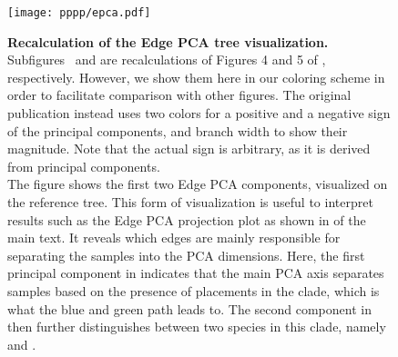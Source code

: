 \begin{figure}[hpbt]
    \centering
    \texttt{[image: pppp/epca.pdf]}
    \begin{subfigure}{0pt}
        \label{fig:epca:sub:comp1}
    \end{subfigure}
    \begin{subfigure}{0pt}
        \label{fig:epca:sub:comp2}
    \end{subfigure}
    \caption[Recalculation of the Edge PCA tree visualization]{
        \textbf{Recalculation of the Edge PCA tree visualization.}
        Subfigures~ and  are recalculations
        of Figures 4 and 5 of \cite{Matsen2011a}, respectively.
        However, we show them here in our coloring scheme in order to facilitate comparison with other figures.
        The original publication instead uses two colors for a positive and a negative sign of the principal components,
        and branch width to show their magnitude.
        Note that the actual sign is arbitrary, as it is derived from principal components.
        \\
        The figure shows the first two Edge PCA components, visualized on the reference tree.
        This form of visualization is useful to interpret results such as the Edge PCA projection plot
        as shown in  of the main text.
        It reveals which edges are mainly responsible for separating the samples into the PCA dimensions.
        Here, the first principal component in  indicates that the main PCA axis
        separates samples based on the presence of placements in the  clade,
        which is what the blue and green path leads to.
        The second component in  then further distinguishes between two species
        in this clade, namely  and .
    }
    \label{fig:epca}
\end{figure}


